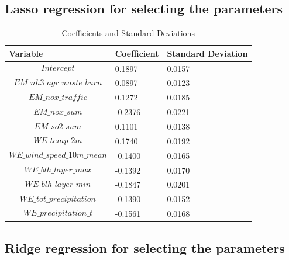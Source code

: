 \documentclass[10pt]{article} %
\begin{document}
    \subsection{Lasso regression for selecting the parameters}
    \begin{table}[htbp]
    \centering
    \label{tab:coefficients}
    \begin{tabular}{lll}
    \hline
    \textbf{Variable} & \textbf{Coefficient} & \textbf{Standard Deviation} \\
    \hline
    $$Intercept$$ & 0.1897 & 0.0157 \\
    $$EM\_nh3\_agr\_waste\_burn$$ & 0.0897 & 0.0123 \\
    $$EM\_nox\_traffic$$ & 0.1272 & 0.0185 \\
    $$EM\_nox\_sum$$ & -0.2376 & 0.0221 \\
    $$EM\_so2\_sum$$ & 0.1101 & 0.0138 \\
    $$WE\_temp\_2m$$ & 0.1740 & 0.0192 \\
    $$WE\_wind\_speed\_10m\_mean$$ & -0.1400 & 0.0165 \\
    $$WE\_blh\_layer\_max$$ & -0.1392 & 0.0170 \\
    $$WE\_blh\_layer\_min$$ & -0.1847 & 0.0201 \\
    $$WE\_tot\_precipitation$$ & -0.1390 & 0.0152 \\
    $$WE\_precipitation\_t$$  & -0.1561 & 0.0168 \\
    \hline
    \end{tabular}
    \caption{Coefficients and Standard Deviations}
    \end{table}

    \subsection{Ridge regression for selecting the parameters}
\end{document}
